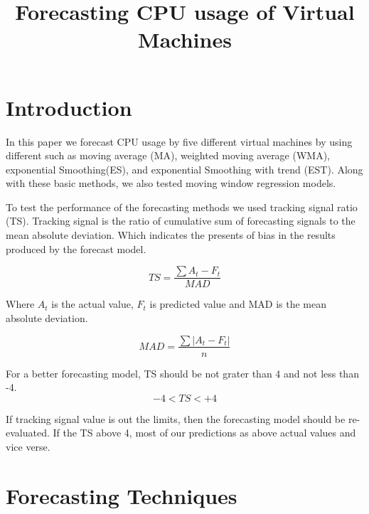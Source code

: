 \documentclass[conference,onecolumn]{IEEEtran}
\begin{document}
\title{Forecasting CPU usage of Virtual Machines}
\author{
}

\maketitle

\IEEEpeerreviewmaketitle



\section{Introduction}
\label{sec:intro}
In this paper we forecast CPU usage by five different virtual machines by using different such as moving average (MA), weighted moving average (WMA), exponential Smoothing(ES), and exponential Smoothing with trend (EST). Along with these basic methods, we also tested moving window regression models.

To test the performance of the forecasting methods we used tracking signal ratio (TS). Tracking signal is the ratio of cumulative sum of forecasting signals to the mean absolute deviation. Which indicates the presents of bias in the results produced by the forecast model.

\begin{equation}
TS = \frac{\sum A_t - F_t}{MAD}
\end{equation}

Where $A_t$ is the actual value, $F_t$ is predicted value and MAD is the mean absolute deviation.

\begin{equation}
MAD = \frac{\sum |A_t - F_t|}{n}
\end{equation}

For a better forecasting model, TS should be not grater than 4 and not less than -4.
\begin{equation}
-4 < TS < +4 
\end{equation}

If tracking signal value is out the limits, then the forecasting model should be re-evaluated. If the TS above 4, most of our predictions as above actual values and vice verse.


\section{Forecasting Techniques}
\label{sec:FT}
\end{document}
